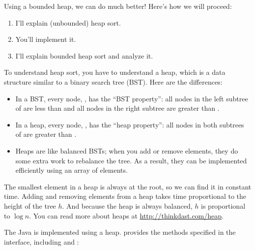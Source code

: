 \documentclass[12pt]{book}
\theoremstyle{exercise}
\begin{document}
Using a bounded heap, we can do much better! Here's how we will
proceed:

\begin{enumerate}

\item
  I'll explain (unbounded) heap sort.

\item
  You'll implement it.

\item
  I'll explain bounded heap sort and analyze it.

\end{enumerate}


To understand heap sort, you have to understand a heap, which is a data
structure similar to a binary search tree (BST). Here are the differences:

\begin{itemize}

\item
  In a BST, every node, , has the ``BST property'': all nodes
  in the left subtree of  are less than  and all
  nodes in the right subtree are greater than .

\item
  In a heap, every node, , has the ``heap property'': all
  nodes in both subtrees of  are greater than .

\item
  Heaps are like balanced BSTs; when you add or remove elements, they
  do some extra work to rebalance the tree.  As a result, they can
  be implemented efficiently using an array of elements.

\end{itemize}

The smallest element in a heap is always at the root, so we can find
it in constant time. Adding and removing elements from a heap takes
time proportional to the height of the tree $h$. And because the heap
is always balanced, $h$ is proportional to $\log n$.  You can read
more about heaps at \url{http://thinkdast.com/heap}.


The Java  is implemented using a heap.
 provides the methods specified in the
 interface, including  and :
\end{document}
